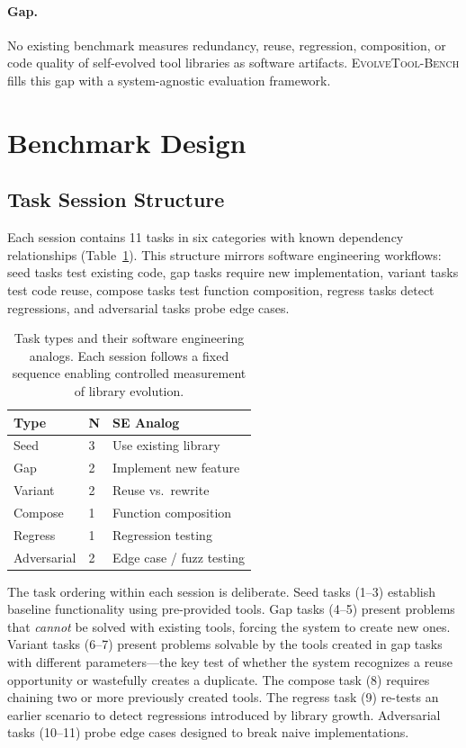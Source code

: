 \documentclass[10pt,twocolumn]{article}
\begin{document}
\paragraph{Gap.} No existing benchmark measures redundancy, reuse, regression, composition, or code quality of self-evolved tool libraries as software artifacts. \textsc{EvolveTool-Bench} fills this gap with a system-agnostic evaluation framework.

\section{Benchmark Design}

\subsection{Task Session Structure}

Each session contains 11 tasks in six categories with known dependency relationships (Table~\ref{tab:task_types}). This structure mirrors software engineering workflows: seed tasks test existing code, gap tasks require new implementation, variant tasks test code reuse, compose tasks test function composition, regress tasks detect regressions, and adversarial tasks probe edge cases.

\begin{table}[t]
\centering
\footnotesize
\begin{tabular}{llp{3.2cm}}
\toprule
\textbf{Type} & \textbf{N} & \textbf{SE Analog} \\
\midrule
Seed & 3 & Use existing library \\
Gap & 2 & Implement new feature \\
Variant & 2 & Reuse vs.\ rewrite \\
Compose & 1 & Function composition \\
Regress & 1 & Regression testing \\
Adversarial & 2 & Edge case / fuzz testing \\
\bottomrule
\end{tabular}
\caption{Task types and their software engineering analogs. Each session follows a fixed sequence enabling controlled measurement of library evolution.}
\label{tab:task_types}
\end{table}

The task ordering within each session is deliberate. Seed tasks (1--3) establish baseline functionality using pre-provided tools. Gap tasks (4--5) present problems that \emph{cannot} be solved with existing tools, forcing the system to create new ones. Variant tasks (6--7) present problems solvable by the tools created in gap tasks with different parameters---the key test of whether the system recognizes a reuse opportunity or wastefully creates a duplicate. The compose task (8) requires chaining two or more previously created tools. The regress task (9) re-tests an earlier scenario to detect regressions introduced by library growth. Adversarial tasks (10--11) probe edge cases designed to break naive implementations.
\end{document}
